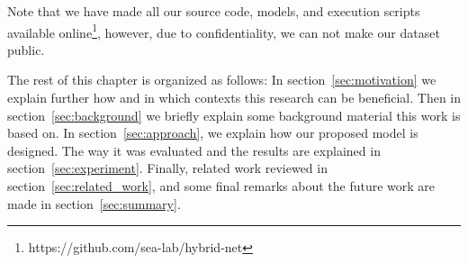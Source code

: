 Note that we have made all our source code, models, and execution scripts available online\footnote{https://github.com/sea-lab/hybrid-net}, however, due to confidentiality, we can not make our dataset public. 

The rest of this chapter is organized as follows: In section~\ref{sec:motivation} we explain further how and in which contexts this research can be beneficial. Then in section~\ref{sec:background} we briefly explain some background material this work is based on. In section~\ref{sec:approach}, we explain how our proposed model is designed. The way it was evaluated and the results are explained in section~\ref{sec:experiment}. Finally, related work reviewed in section~\ref{sec:related_work}, and some final remarks about the future work are made in section~\ref{sec:summary}.